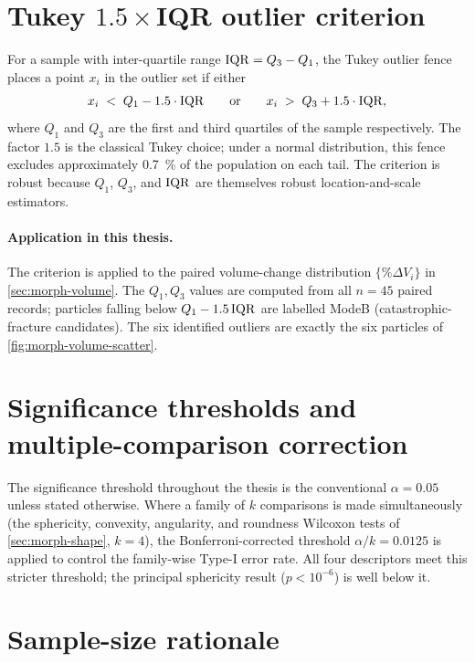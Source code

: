 \section{\texorpdfstring{Tukey $1.5\times$\gls{IQR} outlier criterion}
                         {Tukey 1.5xIQR outlier criterion}}
\label{sec:appC-tukey}

For a sample with inter-quartile range $\mathrm{IQR} = Q_3 - Q_1$, the Tukey
outlier fence places a point $x_i$ in the outlier set if either
\begin{equation}
x_i \;<\; Q_1 - 1.5 \cdot \mathrm{IQR}
\qquad\text{or}\qquad
x_i \;>\; Q_3 + 1.5 \cdot \mathrm{IQR},
\label{eq:appC-tukey}
\end{equation}
where $Q_1$ and $Q_3$ are the first and third quartiles of the sample
respectively. The factor $1.5$ is the classical Tukey choice; under a
normal distribution, this fence excludes approximately
\SI{0.7}{\percent} of the population on each tail. The criterion is
robust because $Q_1$, $Q_3$, and $\mathrm{IQR}$ are themselves robust
location-and-scale estimators.

\paragraph{Application in this thesis.} The criterion is applied to
the paired volume-change distribution $\{\%\Delta V_i\}$ in
\cref{sec:morph-volume}. The $Q_1, Q_3$ values are computed from all
$n=45$ paired records; particles falling below
$Q_1 - 1.5\,\mathrm{IQR}$ are labelled \gls{ModeB} (catastrophic-fracture
candidates). The six identified outliers are exactly the six particles
of \cref{fig:morph-volume-scatter}.

\section{Significance thresholds and multiple-comparison correction}

The significance threshold throughout the thesis is the conventional
$\alpha = 0.05$ unless stated otherwise. Where a family of $k$
comparisons is made simultaneously (the sphericity, convexity,
angularity, and roundness Wilcoxon tests of \cref{sec:morph-shape},
$k=4$), the Bonferroni-corrected threshold $\alpha/k = 0.0125$ is
applied to control the family-wise Type-I error rate. All four
descriptors meet this stricter threshold; the principal sphericity
result ($p<10^{-6}$) is well below it.

\section{Sample-size rationale}

